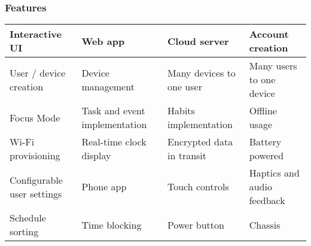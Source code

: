 \documentclass{beamer}
\begin{document}
\begin{frame}
  \frametitle{Features}
  \begin{table}
    \centering
    \small
    \begin{tabular}{|p{}|p{}|p{}|p{}|}
      \hline
      \cellcolor[HTML]{CFE2F3}Interactive UI           & \cellcolor[HTML]{CFE2F3}Web app                       & \cellcolor[HTML]{CFE2F3}Cloud server               & \cellcolor[HTML]{CFE2F3}Account creation         \\ \hline
      \cellcolor[HTML]{CFE2F3}User / device creation   & \cellcolor[HTML]{CFE2F3}Device management             & \cellcolor[HTML]{CFE2F3}Many devices to one user   & \cellcolor[HTML]{CFE2F3}Many users to one device \\ \hline
      \cellcolor[HTML]{CFE2F3}Focus Mode               & \cellcolor[HTML]{CFE2F3}Task and event implementation & \cellcolor[HTML]{CFE2F3}Habits implementation      & \cellcolor[HTML]{CFE2F3}Offline usage            \\ \hline
      \cellcolor[HTML]{CFE2F3}Wi-Fi provisioning       & \cellcolor[HTML]{CFE2F3}Real-time clock display       & \cellcolor[HTML]{CFE2F3}Encrypted data in transit  & Battery powered                                  \\ \hline
      Configurable user settings                       & Phone app                                             & Touch controls                                     & Haptics and audio feedback                       \\ \hline
      Schedule sorting                                 & Time blocking                                         & Power button                                       & Chassis                                       \\ \hline
    \end{tabular}
  \end{table}

  \renewcommand{\thefootnote}{\roman{footnote}}
\end{frame}
\end{document}
